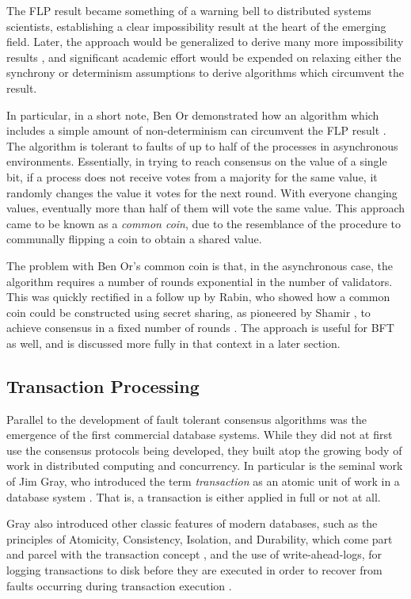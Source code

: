 The FLP result became something of a warning bell to distributed systems scientists, 
establishing a clear impossibility result at the heart of the emerging field.
Later, the approach would be generalized to derive many more impossibility results \cite{impossibility},
and significant academic effort would be expended on relaxing either the synchrony or determinism assumptions to derive algorithms which circumvent the result.

In particular, in a short note, 
Ben Or demonstrated how an algorithm which includes a simple amount of non-determinism can circumvent the FLP result \cite{free-choice}.
The algorithm is tolerant to faults of up to half of the processes in asynchronous environments.
Essentially, in trying to reach consensus on the value of a single bit, 
if a process does not receive votes from a majority for the same value, it randomly changes the value it votes for the next round.
With everyone changing values, eventually more than half of them will vote the same value.
This approach came to be known as a \emph{common coin},
due to the resemblance of the procedure to communally flipping a coin to obtain a shared value.

The problem with Ben Or's common coin is that, in the asynchronous case,
the algorithm requires a number of rounds exponential in the number of validators.
This was quickly rectified in a follow up by Rabin, who showed how a common coin
could be constructed using secret sharing, as pioneered by Shamir \cite{shamir1979share},
to achieve consensus in a fixed number of rounds \cite{rabin1983randomized}.
The approach is useful for BFT as well, and is discussed more fully in that context in a later section.

\subsection{Transaction Processing}

Parallel to the development of fault tolerant consensus algorithms was the emergence of the first commercial database systems.
While they did not at first use the consensus protocols being developed, 
they built atop the growing body of work in distributed computing and concurrency.
In particular is the seminal work of Jim Gray, who introduced the term \emph{transaction} 
as an atomic unit of work in a database system \cite{gray1981transaction}. 
That is, a transaction is either applied in full or not at all.

Gray also introduced other classic features of modern databases,
such as the principles of Atomicity, Consistency, Isolation, and Durability, 
which come part and parcel with the transaction concept \cite{gray1981transaction},
and the use of write-ahead-logs, for logging transactions to disk before they are executed
in order to recover from faults occurring during transaction execution \cite{gray1978notes}.

